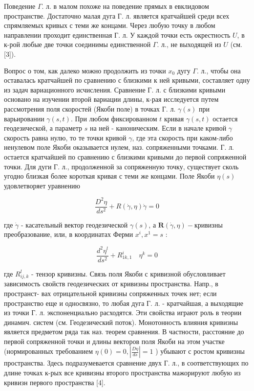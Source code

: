 \documentclass[10pt]{article}
\begin{document}
Поведение $\Gamma$. л. в малом похоже на поведение прямых в евклидовом пространстве. Достаточно малая дуга Г. л. является кратчайшей среди всех спрямляемых кривых с теми же концами. Через любую точку в любом направлении проходит единственная Г. л. У каждой точки есть окрестность $U$, в к-рой любые две точки соединимы единственной $\Gamma$. л., не выходящей из $U$ (см. [3]).



Вопрос о том, как далеко можно продолжить из точки $x_{0}$ дугу $\Gamma$. л., чтобы она оставалась кратчайшей по сравнению с близкими к ней кривыми, составляет одну из задач вариационного исчисления. Сравнение Г. л. с близкими кривыми основано на изучении второй вариации длины, к-рая исследуется путем рассмотрения поля скоростей (Якоби поле) в точках Г. л. $\gamma(s)$ при варьировании $\gamma(s, t)$. При любом фиксированном $t$ кривая $\gamma(s, t)$ остается геодезической, а параметр $s$ на ней - каноническим. Если в начале кривой $\gamma$ скорость равна нулю, то те точки кривой $\gamma$, где эта скорость при каком-либо ненулевом поле Якоби оказывается нулем, наз. сопряженными точками. Г. л. остается кратчайшей по сравнению с близкими кривыми до первой сопряженной точки. Для дуги Г. л., продолженной за сопряженную точку, существует сколь угодно близкая более короткая кривая с теми же концами. Поле Якоби $\eta(s)$ удовлетворяет уравнению



\[

\frac{D^{2} \eta}{d s^{2}}+R(\dot{\gamma}, \eta) \dot{\gamma}=0

\]



где $\dot{\gamma}$ - касательный вектор геодезической $\gamma(s)$, а $\boldsymbol{R}(\dot{\gamma}, \eta)-к р и в и з н ы$ преобразование, или, в координатах Ферми $x^{i}, x^{1}=s$ :



\[

\frac{d^{2} \eta^{l}}{d s^{2}}+R_{1 k, 1}^{i} \quad \eta^{k}=0

\]



где $R_{i j, k}^{l}$ - тензор кривизны. Связь поля Якоби с кривизной обусловливает зависимость свойств геодезических от кривизны пространства. Напр., в пространст- вах отрицательной кривизны сопряженных точек нет; если пространство еще и односвязно, то любая дуга Г. л. - кратчайшая, а выходящие из точки Г. л. экспоненциально расходятся. Эти свойства играют роль в теории динамич. систем (см. Геодезический поток). Монотонность влияния кривизны является предметом ряда так наз. теорем сравнения. В частности, расстояние до первой сопряженной точки и длины векторов поля Якоби на этом участке (нормированных требованием $\eta(0)=0,\left|\frac{D \eta}{d s}\right|=1$ ) убывают с ростом кривизны пространства. Здесь подразумевается сравнение двух Г. л., в соответствующих по длине точках к-рых все кривизны второго пространства мажорируют любую из кривизн первого пространства [4].
\end{document}
